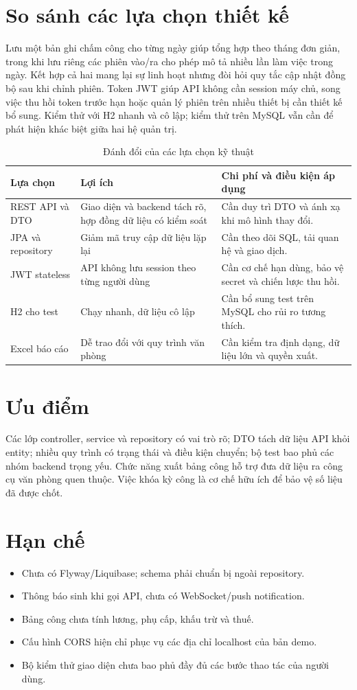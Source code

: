 \documentclass[12pt,a4paper,oneside]{report}
\begin{document}
\section{So sánh các lựa chọn thiết kế}
Lưu một bản ghi chấm công cho từng ngày giúp tổng hợp theo tháng đơn giản, trong khi lưu riêng các phiên vào/ra cho phép mô tả nhiều lần làm việc trong ngày. Kết hợp cả hai mang lại sự linh hoạt nhưng đòi hỏi quy tắc cập nhật đồng bộ sau khi chỉnh phiên. Token JWT giúp API không cần session máy chủ, song việc thu hồi token trước hạn hoặc quản lý phiên trên nhiều thiết bị cần thiết kế bổ sung. Kiểm thử với H2 nhanh và cô lập; kiểm thử trên MySQL vẫn cần để phát hiện khác biệt giữa hai hệ quản trị.

\begin{table}[H]\centering\caption{Đánh đổi của các lựa chọn kỹ thuật}
\begin{tabularx}{\textwidth}{p{3.2cm}p{4.3cm}X}\toprule
\textbf{Lựa chọn}&\textbf{Lợi ích}&\textbf{Chi phí và điều kiện áp dụng}\\\midrule
REST API và DTO&Giao diện và backend tách rõ, hợp đồng dữ liệu có kiểm soát&Cần duy trì DTO và ánh xạ khi mô hình thay đổi.\\
JPA và repository&Giảm mã truy cập dữ liệu lặp lại&Cần theo dõi SQL, tải quan hệ và giao dịch.\\
JWT stateless&API không lưu session theo từng người dùng&Cần cơ chế hạn dùng, bảo vệ secret và chiến lược thu hồi.\\
H2 cho test&Chạy nhanh, dữ liệu cô lập&Cần bổ sung test trên MySQL cho rủi ro tương thích.\\
Excel báo cáo&Dễ trao đổi với quy trình văn phòng&Cần kiểm tra định dạng, dữ liệu lớn và quyền xuất.\\\bottomrule
\end{tabularx}\end{table}

\section{Ưu điểm}
Các lớp controller, service và repository có vai trò rõ; DTO tách dữ liệu API khỏi entity; nhiều quy trình có trạng thái và điều kiện chuyển; bộ test bao phủ các nhóm backend trọng yếu. Chức năng xuất bảng công hỗ trợ đưa dữ liệu ra công cụ văn phòng quen thuộc. Việc khóa kỳ công là cơ chế hữu ích để bảo vệ số liệu đã được chốt.

\section{Hạn chế}
\begin{itemize}
\item Chưa có Flyway/Liquibase; schema phải chuẩn bị ngoài repository.
\item Thông báo sinh khi gọi API, chưa có WebSocket/push notification.
\item Bảng công chưa tính lương, phụ cấp, khấu trừ và thuế.
\item Cấu hình CORS hiện chỉ phục vụ các địa chỉ localhost của bản demo.
\item Bộ kiểm thử giao diện chưa bao phủ đầy đủ các bước thao tác của người dùng.
\end{itemize}
\end{document}
